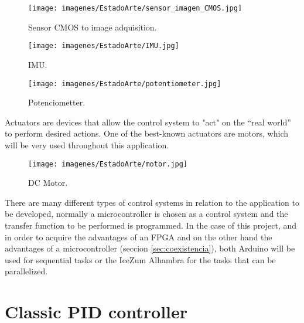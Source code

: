 \begin{center}
	\begin{figure}[H]
		\center
		\texttt{[image: imagenes/EstadoArte/sensor\_imagen\_CMOS.jpg]}
		\caption{Sensor CMOS to image adquisition.}
		\label{fig:camara_CMOS}
	\end{figure}
\end{center}

\begin{center}
	\begin{figure}[H]
		\center
		\texttt{[image: imagenes/EstadoArte/IMU.jpg]}
		\caption{IMU.}
		\label{fig:IMU}
	\end{figure}
\end{center}

\begin{center}
	\begin{figure}[H]
		\center
		\texttt{[image: imagenes/EstadoArte/potentiometer.jpg]}
		\caption{Potenciometter.}
		\label{fig:potentiometer}
	\end{figure}
\end{center}

Actuators are devices that allow the control system to "act" on the “real world” to perform desired actions. One of the best-known actuators are motors, which will be very used throughout this application.  \newline

\begin{center}
	\begin{figure}[H]
		\center
		\texttt{[image: imagenes/EstadoArte/motor.jpg]}
		\caption{DC Motor.}
		\label{fig:motor_DC}
	\end{figure}
\end{center}


There are many different types of control systems in relation to the application to be developed, normally a microcontroller is chosen as a control system and the transfer function to be performed is programmed.\newline
In the case of this project, and in order to acquire the advantages of an FPGA and on the other hand the advantages of a microcontroller (seccion \ref{sec:coexistencia}), both Arduino will be used for sequential tasks or the IceZum Alhambra for the tasks that can be parallelized. \newline
\section{Classic PID controller}\label{sec:PID}

